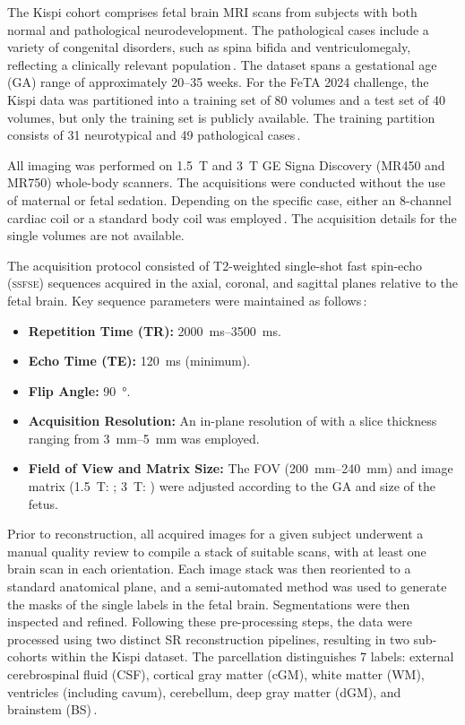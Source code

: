The Kispi cohort comprises fetal brain MRI scans from subjects with both normal and pathological neurodevelopment. The pathological cases include a variety of congenital disorders, such as spina bifida and ventriculomegaly, reflecting a clinically relevant population\,\cite{FeTA2024_paper, Ciceri2024}. The dataset spans a gestational age (GA) range of approximately \numrange{20}{35} weeks. For the FeTA 2024 challenge, the Kispi data was partitioned into a training set of \num{80} volumes and a test set of \num{40} volumes, but only the training set is publicly available. The training partition consists of \num{31} neurotypical and \num{49} pathological cases\,\cite{FeTA2024_review}.

All imaging was performed on \qty{1.5}{\tesla} and \qty{3}{\tesla} GE Signa Discovery (MR450 and MR750) whole-body scanners. The acquisitions were conducted without the use of maternal or fetal sedation. Depending on the specific case, either an 8-channel cardiac coil or a standard body coil was employed\,\cite{FeTA2024_paper}. The acquisition details for the single volumes are not available.

The acquisition protocol consisted of T2-weighted single-shot fast spin-echo (\textsc{ssfse}) sequences acquired in the axial, coronal, and sagittal planes relative to the fetal brain. Key sequence parameters were maintained as follows\,\cite{FeTA2024_paper}:
\begin{itemize}
    \item \textbf{Repetition Time (TR):} \qtyrange[range-units = single, range-phrase = --]{2000}{3500}{\milli\second}.
    \item \textbf{Echo Time (TE):} \qty{120}{\milli\second} (minimum).
    \item \textbf{Flip Angle:} \qty{90}{\degree}.
    \item \textbf{Acquisition Resolution:} An in-plane resolution of  with a slice thickness ranging from \qtyrange[range-units = single]{3}{5}{\milli\meter} was employed.
    \item \textbf{Field of View and Matrix Size:} The FOV (\qtyrange[range-units = single, range-phrase = --]{200}{240}{\milli\meter}) and image matrix (\qty{1.5}{\tesla}: ; \qty{3}{\tesla}: ) were adjusted according to the GA and size of the fetus.
\end{itemize}

Prior to reconstruction, all acquired images for a given subject underwent a manual quality review to compile a stack of suitable scans, with at least one brain scan in each orientation. Each image stack was then reoriented to a standard anatomical plane, and a semi-automated method was used to generate the masks of the single labels in the fetal brain. Segmentations were then inspected and refined. Following these pre-processing steps, the data were processed using two distinct SR reconstruction pipelines, resulting in two sub-cohorts within the Kispi dataset. The parcellation distinguishes 7 labels: external cerebrospinal fluid (CSF), cortical gray matter (cGM), white matter (WM), ventricles (including cavum), cerebellum, deep gray matter (dGM), and brainstem (BS)\,\cite{FeTA2024_paper}.

